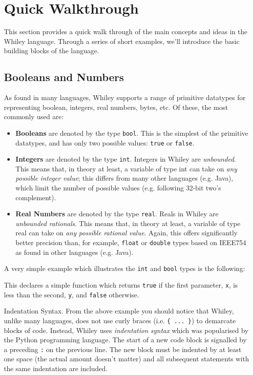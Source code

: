 \newpage
\section{Quick Walkthrough}
This section provides a quick walk through of the main concepts and
ideas in the Whiley language.  Through a series of short examples,
we'll introduce the basic building blocks of the language.

\subsection{Booleans and Numbers}

As found in many languages, Whiley supports a range of primitive
datatypes for representing boolean, integers, real numbers, bytes,
etc.  Of these, the most commonly used are:

\begin{itemize}
\item {\bf Booleans} are denoted by the type \lstinline{bool}.  This is the
  simplest of the primitive datatypes, and has only two possible
  values: \lstinline{true} or \lstinline{false}.
\item {\bf Integers} are denoted by the type \lstinline{int}.  Integers in
  Whiley are {\em unbounded}. This means that, in theory at least, a
  variable of type int can take on {\em any possible integer value};
  this differs from many other languages (e.g. Java), which limit the
  number of possible values (e.g. following 32-bit two's complement).
\item {\bf Real Numbers} are denoted by the type
  \lstinline{real}. Reals in Whiley are {\em unbounded
    rationals}. This means that, in theory at least, a variable of
  type real can take on {\em any possible rational value}. Again, this
  offers significantly better precision than, for example,
  \lstinline{float} or \lstinline{double} types based on IEEE754 as
  found in other languages (e.g. Java).
\end{itemize}


\noindent A very simple example which illustrates the \lstinline{int} and
\lstinline{bool} types is the following:



This declares a simple function which returns \lstinline{true} if the
first parameter, \lstinline{x}, is less than the second,
\lstinline{y}, and \lstinline{false} otherwise.

\begin{insight}{Indentation Syntax.}
  From the above example you should notice that Whiley, unlike many
  languages, does not use curly braces (i.e. \verb+{ ... }+) to
  demarcate blocks of code.  Instead, Whiley uses {\em indentation
    syntax} which was popularised by the Python programming language.
  The start of a new code block is signalled by a preceding \verb+:+
  on the previous line.  The new block must be indented by at least
  one space (the actual amount doesn't matter) and all subsequent
  statements with the same indentation are included.
\end{insight}

